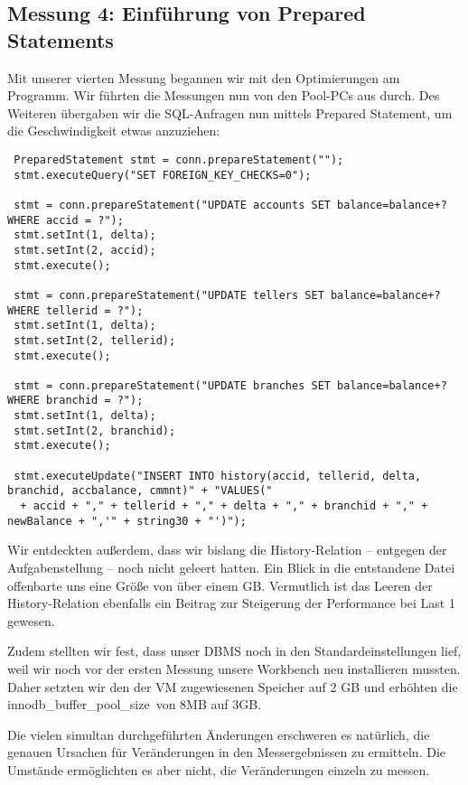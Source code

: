 \documentclass[a4paper, bibliography=totoc, 12pt]{scrartcl}
\begin{document}
	\subsection{Messung 4: Einführung von Prepared Statements}
Mit unserer vierten Messung begannen wir mit den Optimierungen am Programm. Wir führten die Messungen nun von den Pool-PCs aus durch. Des Weiteren übergaben wir die SQL-Anfragen nun mittels Prepared Statement, um die Geschwindigkeit etwas anzuziehen:
	\begin{lstlisting}
 PreparedStatement stmt = conn.prepareStatement("");
 stmt.executeQuery("SET FOREIGN_KEY_CHECKS=0");
		
 stmt = conn.prepareStatement("UPDATE accounts SET balance=balance+? WHERE accid = ?");
 stmt.setInt(1, delta);
 stmt.setInt(2, accid);
 stmt.execute();
		
 stmt = conn.prepareStatement("UPDATE tellers SET balance=balance+? WHERE tellerid = ?");
 stmt.setInt(1, delta);
 stmt.setInt(2, tellerid);
 stmt.execute();
		
 stmt = conn.prepareStatement("UPDATE branches SET balance=balance+? WHERE branchid = ?");
 stmt.setInt(1, delta);
 stmt.setInt(2, branchid);
 stmt.execute();
		
 stmt.executeUpdate("INSERT INTO history(accid, tellerid, delta, branchid, accbalance, cmmnt)" + "VALUES("
  + accid + "," + tellerid + "," + delta + "," + branchid + "," + newBalance + ",'" + string30 + "')");
	\end{lstlisting}
	
	\noindent
	Wir entdeckten außerdem, dass wir bislang die History-Relation -- entgegen der Aufgabenstellung -- noch nicht geleert hatten. Ein Blick in die entstandene Datei offenbarte uns eine Größe von über einem GB. Vermutlich ist das Leeren der History-Relation ebenfalls ein Beitrag zur Steigerung der Performance bei Last 1 gewesen.
	
	Zudem stellten wir fest, dass unser DBMS noch in den Standardeinstellungen lief, weil wir noch vor der ersten Messung unsere Workbench neu installieren mussten. Daher setzten wir den der VM zugewiesenen Speicher auf 2 GB und erhöhten die\\ \glqq innodb\_buffer\_pool\_size\grqq\ von 8MB auf 3GB.

Die vielen simultan durchgeführten Änderungen erschweren es natürlich, die genauen Ursachen für Veränderungen in den Messergebnissen zu ermitteln. Die Umstände ermöglichten es aber nicht, die Veränderungen einzeln zu messen.
	
\end{document}
